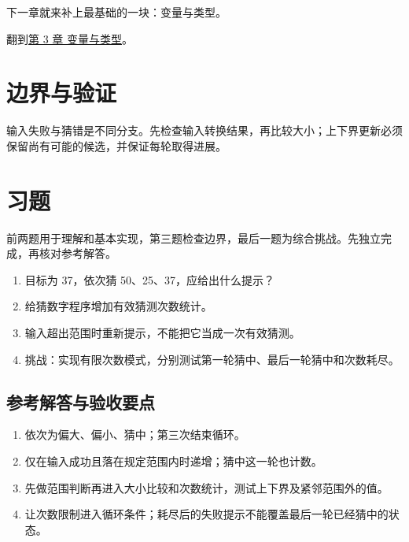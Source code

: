 下一章就来补上最基础的一块：变量与类型。

翻到\hyperref[ch:03]{第 3 章 变量与类型}。

\section{边界与验证}

输入失败与猜错是不同分支。先检查输入转换结果，再比较大小；上下界更新必须保留尚有可能的候选，并保证每轮取得进展。

\section{习题}

前两题用于理解和基本实现，第三题检查边界，最后一题为综合挑战。先独立完成，再核对参考解答。

\begin{enumerate}

\item 目标为 37，依次猜 50、25、37，应给出什么提示？

\item 给猜数字程序增加有效猜测次数统计。

\item 输入超出范围时重新提示，不能把它当成一次有效猜测。

\item 挑战：实现有限次数模式，分别测试第一轮猜中、最后一轮猜中和次数耗尽。

\end{enumerate}

\subsection*{参考解答与验收要点}

\begin{enumerate}

\item 依次为偏大、偏小、猜中；第三次结束循环。

\item 仅在输入成功且落在规定范围内时递增；猜中这一轮也计数。

\item 先做范围判断再进入大小比较和次数统计，测试上下界及紧邻范围外的值。

\item 让次数限制进入循环条件；耗尽后的失败提示不能覆盖最后一轮已经猜中的状态。

\end{enumerate}

